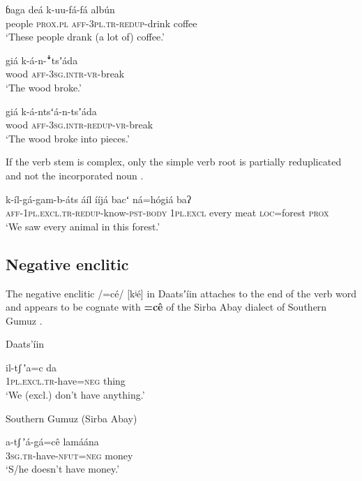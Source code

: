 \documentclass[output=paper]{langsci/langscibook}
\begin{document}
\ea\label{ex:ahlandc:37}
\gll
ɓaga  deá  k-uu-fá-fá   alb\'{u}n   \\
people  \textsc{prox.pl}  \textsc{aff-3pl.tr-redup}{}-drink   coffee \\
\glt
‘These people drank (a lot of) coffee.’ 
\z

\ea\label{ex:ahlandc:38}
\gll
giá     k-á-n-\textsf{ꜜ}tsʼáda \\
wood \textsc{aff-3sg.intr}{}-\textsc{vr-}break \\
\glt
‘The wood broke.’
\z

\ea\label{ex:ahlandc:39}
\gll
giá       k-á-ntsʻá-n-tsʼáda  \\
wood  \textsc{aff-3sg.intr}{}-\textsc{redup}{}-\textsc{vr}{}-break \\
\glt
 ‘The wood broke into pieces.’
\z

If the verb stem is complex, only the simple verb root is partially reduplicated and not the incorporated noun . 

\ea\label{ex:ahlandc:40}
\gll
k-íl-gá-gam-b-áts                                        áíl           ííjá      bacʻ   ná=h\'{o}giá  baʔ \\
\textsc{aff-1pl.excl.tr-redup}{}-know-\textsc{pst-body} \textsc{1pl.excl} every  meat  \textsc{loc}=forest \textsc{prox} \\
\glt
‘We saw every animal in this forest.’
\z


\subsection{Negative enclitic}\label{sec:ahlandc:4.8}

The negative enclitic /=cé/ [kʲé] in Daatsʼíin  attaches to the end of the verb word and appears to be cognate with \textbf{=c\^{e}} of the Sirba Abay dialect of Southern Gumuz  \citep[cf.][241-242]{Ahland2012Gumuz}. 

\ea\label{ex:ahlandc:41}
Daats’íin

\gll
{il-tʃ\,ʼa=c}   da \\
\textsc{  1pl.excl.tr}-have=\textsc{neg}     thing \\
\glt
  ‘We (excl.) don’t have anything.’
\z

\ea\label{ex:ahlandc:42}
Southern Gumuz (Sirba Abay)

\gll
  a-{tʃ\,ʼá}-gá=c\^{e}                      lamáána \\
\textsc{  3sg.tr}{}-have-\textsc{nfut=neg  } money \\
\glt
  ‘S/he doesn’t have money.’
\z
\end{document}
